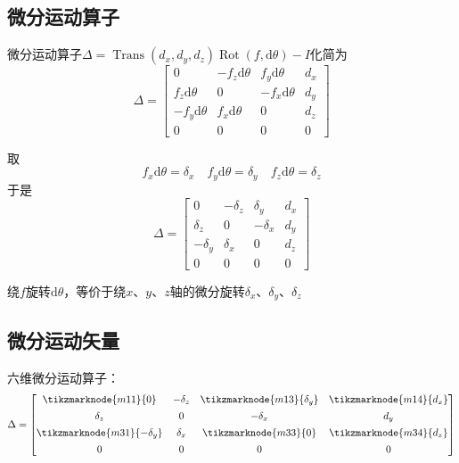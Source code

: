 \subsection{微分运动算子}

微分运动算子$\Delta = \operatorname{Trans}(d_x, d_y, d_z) \operatorname{Rot}(f, \mathrm{d}\theta) - I$化简为
\[
\Delta = 
\begin{bmatrix}
0 & -f_z \mathrm{d}\theta & f_y \mathrm{d}\theta & d_x \\
f_z \mathrm{d}\theta & 0 & -f_x \mathrm{d}\theta & d_y \\
-f_y \mathrm{d}\theta & f_x \mathrm{d}\theta & 0 & d_z \\
0 & 0 & 0 & 0
\end{bmatrix}
\]

取
\[
f_x \mathrm{d}\theta = \delta_x \quad f_y \mathrm{d}\theta = \delta_y \quad f_z \mathrm{d}\theta = \delta_z
\]
于是
\[
\Delta = 
\begin{bmatrix}
0 & -\delta_z & \delta_y & d_x \\
\delta_z & 0 & -\delta_x & d_y \\
-\delta_y & \delta_x & 0 & d_z \\
0 & 0 & 0 & 0
\end{bmatrix}
\]

绕$f$旋转$\mathrm{d}\theta$，等价于绕$x$、$y$、$z$轴的微分旋转$\delta_x$、$\delta_y$、$\delta_z$

\subsection{微分运动矢量}

六维微分运动算子：
\vspace{1in}
$$
    \Delta = \begin{bmatrix}
    \tikzmarknode{m11}{0} & -\delta_z & \tikzmarknode{m13}{\delta_y} & \tikzmarknode{m14}{d_x} \\[1ex]
    \delta_z & 0 & -\delta_x & d_y \\[1ex]
    \tikzmarknode{m31}{-\delta_y} & \delta_x & \tikzmarknode{m33}{0} & \tikzmarknode{m34}{d_z} \\[1ex]
    0 & 0 & 0 & 0
    \end{bmatrix}
$$

